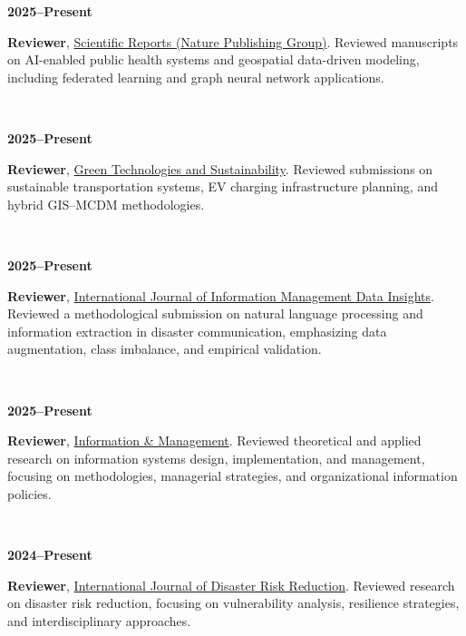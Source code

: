 \documentclass[a4paper,11pt]{article}
\begin{document}
\begin{justify}
\begin{flushleft}

\parbox[t]{2.5cm}{\textbf{2025--Present}}%
\hspace{0.1mm}%
\parbox[t]{\dimexpr\textwidth-2.5cm-0.1mm\relax}{%
\textbf{Reviewer}, \href{https://www.nature.com/srep/}{Scientific Reports (Nature Publishing Group)}. Reviewed manuscripts on AI-enabled public health systems and geospatial data-driven modeling, including federated learning and graph neural network applications.}
\\[0.5em]


\parbox[t]{2.5cm}{\textbf{2025--Present}}%
\hspace{0.1mm}%
\parbox[t]{\dimexpr\textwidth-2.5cm-0.1mm\relax}{%
\textbf{Reviewer}, \href{https://www.sciencedirect.com/journal/green-technologies-and-sustainability}{Green Technologies and Sustainability}. Reviewed submissions on sustainable transportation systems, EV charging infrastructure planning, and hybrid GIS–MCDM methodologies.}
\\[0.5em]

\parbox[t]{2.5cm}{\textbf{2025--Present}}%
\hspace{0.1mm}%
\parbox[t]{\dimexpr\textwidth-2.5cm-0.1mm\relax}{%
\textbf{Reviewer}, \href{https://www.sciencedirect.com/journal/international-journal-of-information-management-data-insights}{International Journal of Information Management Data Insights}. Reviewed a methodological submission on natural language processing and information extraction in disaster communication, emphasizing data augmentation, class imbalance, and empirical validation.}\\[0.5em]

\parbox[t]{2.5cm}{\textbf{2025--Present}}%
\hspace{0.1mm}%
\parbox[t]{\dimexpr\textwidth-2.5cm-0.1mm\relax}{%
\textbf{Reviewer}, \href{https://www.sciencedirect.com/journal/information-and-management}{Information \& Management}. Reviewed theoretical and applied research on information systems design, implementation, and management, focusing on methodologies, managerial strategies, and organizational information policies.}\\[0.5em]


\parbox[t]{2.5cm}{\textbf{2024--Present}}%
\hspace{0.1mm}%
\parbox[t]{\dimexpr\textwidth-2.5cm-0.1mm\relax}{%
\textbf{Reviewer}, \href{https://www.sciencedirect.com/journal/international-journal-of-disaster-risk-reduction}{International Journal of Disaster Risk Reduction}. Reviewed research on disaster risk reduction, focusing on vulnerability analysis, resilience strategies, and interdisciplinary approaches.}\\[0.5em]


\end{flushleft}
\end{justify}
\end{document}
